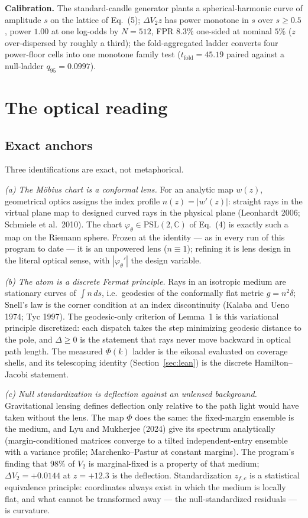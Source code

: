 \documentclass[11pt,a4paper]{article}
\theoremstyle{plain}
\theoremstyle{remark}
\begin{document}
\textbf{Calibration.} The standard-candle generator plants a spherical-harmonic curve of amplitude $s$ on the lattice of Eq.~(5); $\Delta V_2z$ has power monotone in $s$ over $s\ge0.5$, power $1.00$ at one log-odds by $N=512$, FPR $8.3\%$ one-sided at nominal $5\%$ ($z$ over-dispersed by roughly a third); the fold-aggregated ladder converts four power-floor cells into one monotone family test ($t_{\mathrm{fold}}=45.19$ paired against a null-ladder $q_{95}=0.0997$).

\section{The optical reading}
\label{sec:optics}

\subsection{Exact anchors}
Three identifications are exact, not metaphorical.

\emph{(a) The M\"obius chart is a conformal lens.} For an analytic map $w(z)$, geometrical optics assigns the index profile $n(z)=|w'(z)|$: straight rays in the virtual plane map to designed curved rays in the physical plane (Leonhardt 2006; Schmiele et al.\ 2010). The chart $\varphi_\theta\in\mathrm{PSL}(2,\mathbb{C})$ of Eq.~(4) is exactly such a map on the Riemann sphere. Frozen at the identity --- as in every run of this program to date --- it is an unpowered lens ($n\equiv1$); refining it is lens design in the literal optical sense, with $|\varphi_\theta'|$ the design variable.

\emph{(b) The atom is a discrete Fermat principle.} Rays in an isotropic medium are stationary curves of $\int n\,ds$, i.e.\ geodesics of the conformally flat metric $g=n^2\delta$; Snell's law is the corner condition at an index discontinuity (Kalaba and Ueno 1974; Tyc 1997). The geodesic-only criterion of Lemma~1 is this variational principle discretized: each dispatch takes the step minimizing geodesic distance to the pole, and $\Delta\ge0$ is the statement that rays never move backward in optical path length. The measured $\Phi(k)$ ladder is the eikonal evaluated on coverage shells, and its telescoping identity (Section~\ref{sec:lean}) is the discrete Hamilton--Jacobi statement.

\emph{(c) Null standardization is deflection against an unlensed background.} Gravitational lensing defines deflection only relative to the path light would have taken without the lens. The map $\Phi$ does the same: the fixed-margin ensemble is the medium, and Lyu and Mukherjee (2024) give its spectrum analytically (margin-conditioned matrices converge to a tilted independent-entry ensemble with a variance profile; Marchenko--Pastur at constant margins). The program's finding that $98\%$ of $V_2$ is marginal-fixed is a property of that medium; $\Delta V_2=+0.0144$ at $z=+12.3$ is the deflection. Standardization $z_{f,c}$ is a statistical equivalence principle: coordinates always exist in which the medium is locally flat, and what cannot be transformed away --- the null-standardized residuals --- is curvature.
\end{document}
